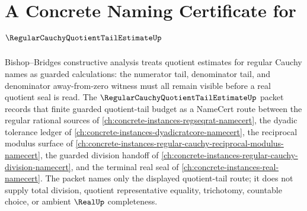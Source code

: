 \chapter{A Concrete Naming Certificate for $\RegularCauchyQuotientTailEstimateUp$}
\label{ch:concrete-instances-regular-cauchy-quotient-tail-estimate-namecert}

Bishop--Bridges constructive analysis treats quotient estimates for regular Cauchy names as guarded calculations: the numerator tail, denominator tail, and denominator away-from-zero witness must all remain visible before a real quotient seal is read. The $\RegularCauchyQuotientTailEstimateUp$ packet records that finite guarded quotient-tail budget as a NameCert route between the regular rational sources of \autoref{ch:concrete-instances-regseqrat-namecert}, the dyadic tolerance ledger of \autoref{ch:concrete-instances-dyadicratcore-namecert}, the reciprocal modulus surface of \autoref{ch:concrete-instances-regular-cauchy-reciprocal-modulus-namecert}, the guarded division handoff of \autoref{ch:concrete-instances-regular-cauchy-division-namecert}, and the terminal real seal of \autoref{ch:concrete-instances-real-namecert}. The packet names only the displayed quotient-tail route; it does not supply total division, quotient representative equality, trichotomy, countable choice, or ambient $\RealUp$ completeness.

